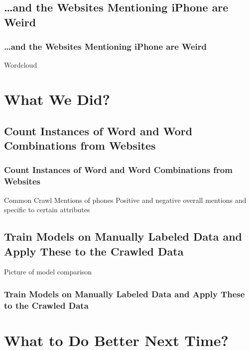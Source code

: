 \documentclass[10pt]{beamer}
\begin{document}
\subsection{\ldots and the Websites Mentioning iPhone are Weird}

\begin{frame}
\frametitle{\ldots and the Websites Mentioning iPhone are Weird}

Wordcloud

\end{frame}

\section{What We Did?}

\subsection{Count Instances of Word and Word Combinations from Websites}

\begin{frame}
\frametitle{Count Instances of Word and Word Combinations from Websites}

Common Crawl
Mentions of phones
Positive and negative overall mentions and specific to certain attributes

\end{frame}

\subsection{Train Models on Manually Labeled Data and Apply These to the Crawled Data}

Picture of model comparison

\begin{frame}
\frametitle{Train Models on Manually Labeled Data and Apply These to the Crawled Data}

\end{frame}

\section{What to Do Better Next Time?}
\end{document}
